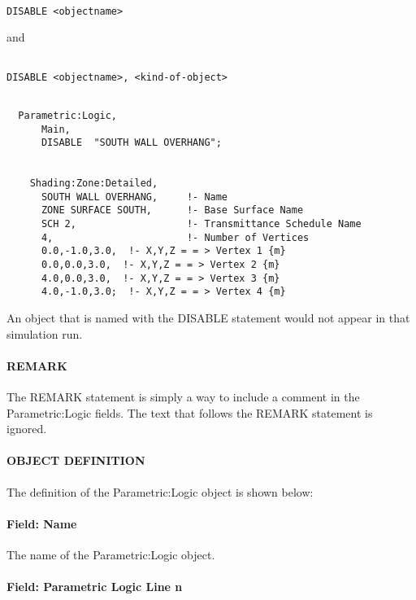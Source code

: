 \begin{lstlisting}

DISABLE <objectname>
\end{lstlisting}

and

\begin{lstlisting}

DISABLE <objectname>, <kind-of-object>
\end{lstlisting}

\begin{lstlisting}

  Parametric:Logic,
      Main,
      DISABLE  "SOUTH WALL OVERHANG";


    Shading:Zone:Detailed,
      SOUTH WALL OVERHANG,     !- Name
      ZONE SURFACE SOUTH,      !- Base Surface Name
      SCH 2,                   !- Transmittance Schedule Name
      4,                       !- Number of Vertices
      0.0,-1.0,3.0,  !- X,Y,Z = = > Vertex 1 {m}
      0.0,0.0,3.0,  !- X,Y,Z = = > Vertex 2 {m}
      4.0,0.0,3.0,  !- X,Y,Z = = > Vertex 3 {m}
      4.0,-1.0,3.0;  !- X,Y,Z = = > Vertex 4 {m}
\end{lstlisting}

An object that is named with the DISABLE statement would not appear in that simulation run.

\paragraph{REMARK}\label{remark}

The REMARK statement is simply a way to include a comment in the Parametric:Logic fields. The text that follows the REMARK statement is ignored.

\paragraph{OBJECT DEFINITION}\label{object-definition}

The definition of the Parametric:Logic object is shown below:

\paragraph{Field: Name}\label{field-name-029}

The name of the Parametric:Logic object.

\paragraph{Field: Parametric Logic Line n}\label{field-parametric-logic-line-n}

